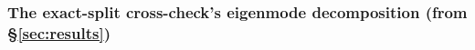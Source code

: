
\subsubsection{The exact-split cross-check's eigenmode decomposition (from \S\ref{sec:results})}
\label{app:devhistory-results}


